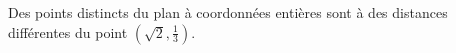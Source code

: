 Des points distincts du plan à coordonnées entières sont à des distances différentes du point $(\sqrt{2}, \frac{1}{3})$.

